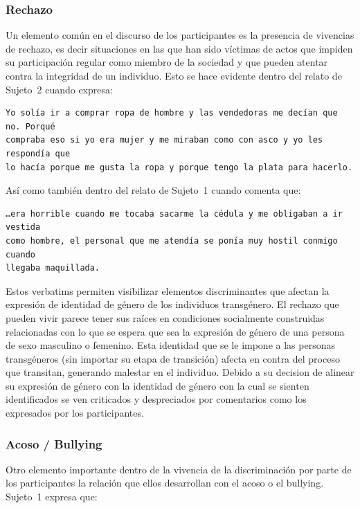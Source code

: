 \subsubsection{Rechazo}

Un elemento común en el discurso de los participantes es la presencia de
vivencias de rechazo, es decir situaciones en las que han sido víctimas de actos
que impiden su participación regular como miembro de la sociedad y que pueden
atentar contra la integridad de un individuo. Esto se hace evidente dentro del
relato de Sujeto~2 cuando expresa:

\begin{verbatim}
Yo solía ir a comprar ropa de hombre y las vendedoras me decían que no. Porqué
compraba eso si yo era mujer y me miraban como con asco y yo les respondía que
lo hacía porque me gusta la ropa y porque tengo la plata para hacerlo.
\end{verbatim}

Así como también dentro del relato de Sujeto~1 cuando comenta que:

\begin{verbatim}
…era horrible cuando me tocaba sacarme la cédula y me obligaban a ir vestida
como hombre, el personal que me atendía se ponía muy hostil conmigo cuando
llegaba maquillada.
\end{verbatim}

Estos verbatims permiten visibilizar elementos discriminantes que afectan la
expresión de identidad de género de los individuos transgénero. El rechazo que
pueden vivir parece tener sus raíces en condiciones socialmente construidas
relacionadas con lo que se espera que sea la expresión de género de una persona
de sexo masculino o femenino. Esta identidad que se le impone a las personas
transgéneros (sin importar su etapa de transición) afecta en contra del proceso
que transitan, generando malestar en el individuo. Debido a su decision de
alinear su expresión de género con la identidad de género con la cual se sienten
identificados se ven criticados y despreciados por comentarios como los
expresados por los participantes.

\subsubsection{Acoso / Bullying}

Otro elemento importante dentro de la vivencia de la discriminación por parte de
los participantes la relación que ellos desarrollan con el acoso o el bullying.
Sujeto~1 expresa que:

